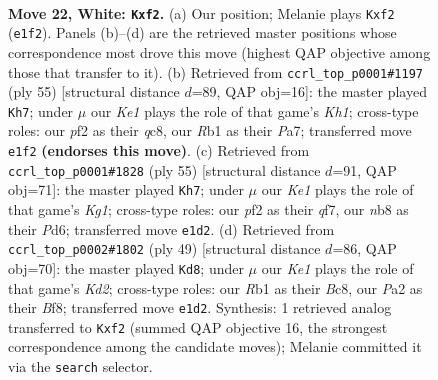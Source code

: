 \documentclass[11pt]{article}
\begin{document}
\clearpage

\begin{figure}[p]\centering
\begin{subfigure}{0.46\textwidth}\centering
\resizebox{\linewidth}{!}{%
\newchessgame
\chessboard[
  setfen={rn5r/8/5p1k/pB1p3p/3P3q/6Q1/PP3pP1/1R2K1N1 w - - 0 22},
  showmover=false,
  pgfstyle=straightmove, color=movearrow, markmove={e1-f2}
]}
\caption{}
\end{subfigure}\hfill
\begin{subfigure}{0.46\textwidth}\centering
\resizebox{\linewidth}{!}{%
\newchessgame
\chessboard[
  setfen={2Q4k/pp3pp1/8/8/2P5/3q2rP/PP2b2K/R3R3 b - - 1 28},
  showmover=false,
  pgfstyle=straightmove, color=movearrow, markmove={h8-h7}
]}
\caption{}
\end{subfigure}
\\[4pt]
\begin{subfigure}{0.46\textwidth}\centering
\resizebox{\linewidth}{!}{%
\newchessgame
\chessboard[
  setfen={2r3k1/1p3Qp1/p2pp3/8/4P2P/2q3P1/P1P5/1K3R2 b - - 3 28},
  showmover=false,
  pgfstyle=straightmove, color=movearrow, markmove={g8-h7}
]}
\caption{}
\end{subfigure}\hfill
\begin{subfigure}{0.46\textwidth}\centering
\resizebox{\linewidth}{!}{%
\newchessgame
\chessboard[
  setfen={2b2br1/3k1p1p/2Qp4/3P1p2/5q2/6P1/PP5P/3R2K1 b - - 1 25},
  showmover=false,
  pgfstyle=straightmove, color=movearrow, markmove={d7-d8}
]}
\caption{}
\end{subfigure}
\caption{\textbf{Move 22, White: \texttt{Kxf2}.} (a) Our position; Melanie plays \texttt{Kxf2} (\texttt{e1f2}). Panels (b)--(d) are the retrieved master positions whose correspondence most drove this move (highest QAP objective among those that transfer to it). (b) Retrieved from \texttt{ccrl\_top\_p0001\#1197} (ply 55) [structural distance $d$=89, QAP obj=16]: the master played \texttt{Kh7}; under $\mu$ our \emph{Ke1} plays the role of that game's \emph{Kh1}; cross-type roles: our \emph{p}f2 as their \emph{q}c8, our \emph{R}b1 as their \emph{P}a7; transferred move \texttt{e1f2} \textbf{(endorses this move)}. (c) Retrieved from \texttt{ccrl\_top\_p0001\#1828} (ply 55) [structural distance $d$=91, QAP obj=71]: the master played \texttt{Kh7}; under $\mu$ our \emph{Ke1} plays the role of that game's \emph{Kg1}; cross-type roles: our \emph{p}f2 as their \emph{q}f7, our \emph{n}b8 as their \emph{P}d6; transferred move \texttt{e1d2}. (d) Retrieved from \texttt{ccrl\_top\_p0002\#1802} (ply 49) [structural distance $d$=86, QAP obj=70]: the master played \texttt{Kd8}; under $\mu$ our \emph{Ke1} plays the role of that game's \emph{Kd2}; cross-type roles: our \emph{R}b1 as their \emph{B}c8, our \emph{P}a2 as their \emph{B}f8; transferred move \texttt{e1d2}. Synthesis: 1 retrieved analog transferred to \texttt{Kxf2} (summed QAP objective 16, the strongest correspondence among the candidate moves); Melanie committed it via the \texttt{search} selector.}
\label{fig:thought-m42}
\end{figure}
\end{document}
